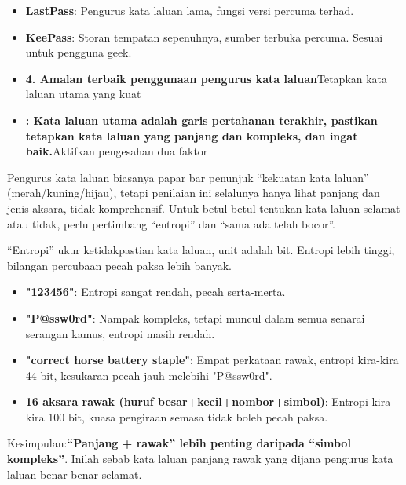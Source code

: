
\begin{itemize}
  \item \textbf{LastPass}: Pengurus kata laluan lama, fungsi versi percuma terhad.
  \item \textbf{KeePass}: Storan tempatan sepenuhnya, sumber terbuka percuma. Sesuai untuk pengguna geek.
  \item \textbf{4. Amalan terbaik penggunaan pengurus kata laluan}Tetapkan kata laluan utama yang kuat
  \item \textbf{: Kata laluan utama adalah garis pertahanan terakhir, pastikan tetapkan kata laluan yang panjang dan kompleks, dan ingat baik.}Aktifkan pengesahan dua faktor
\end{itemize}


Pengurus kata laluan biasanya papar bar penunjuk “kekuatan kata laluan” (merah/kuning/hijau), tetapi penilaian ini selalunya hanya lihat panjang dan jenis aksara, tidak komprehensif. Untuk betul-betul tentukan kata laluan selamat atau tidak, perlu pertimbang “entropi” dan “sama ada telah bocor”.


“Entropi” ukur ketidakpastian kata laluan, unit adalah bit. Entropi lebih tinggi, bilangan percubaan pecah paksa lebih banyak.

\begin{itemize}
  \item \textbf{"123456"}: Entropi sangat rendah, pecah serta-merta.
  \item \textbf{"P@ssw0rd"}: Nampak kompleks, tetapi muncul dalam semua senarai serangan kamus, entropi masih rendah.
  \item \textbf{"correct horse battery staple"}: Empat perkataan rawak, entropi kira-kira 44 bit, kesukaran pecah jauh melebihi "P@ssw0rd".
  \item \textbf{16 aksara rawak (huruf besar+kecil+nombor+simbol)}: Entropi kira-kira 100 bit, kuasa pengiraan semasa tidak boleh pecah paksa.
\end{itemize}

Kesimpulan:\textbf{“Panjang + rawak” lebih penting daripada “simbol kompleks”}. Inilah sebab kata laluan panjang rawak yang dijana pengurus kata laluan benar-benar selamat.

